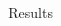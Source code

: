\documentclass[final,hyperref={pdfpagelabels=false}]{beamer}
\begin{document}
\begin{frame}[t]
\begin{columns}[t]
\begin{column}{.465\textwidth}



\end{column} %

\begin{column}{.03\textwidth}\end{column} %
 
\begin{column}{.465\textwidth} %


\begin{block}{Results}

	


\end{block}
\end{column}
\end{columns}
\end{frame}
\end{document}
